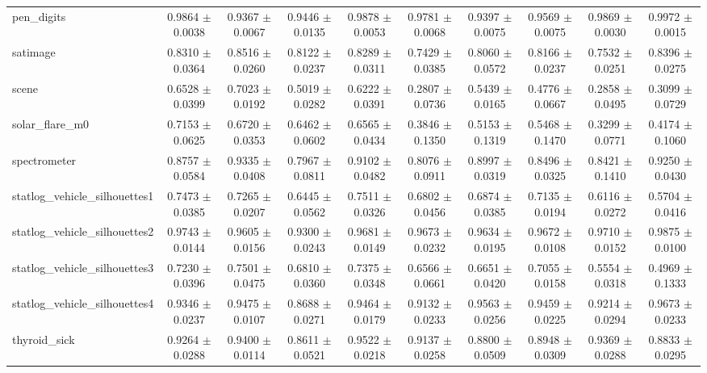 \begin{table*}[htbp]
\begin{tabular}{lccccccccc}
            pen\_digits & 0.9864 $\pm$ 0.0038 & 0.9367 $\pm$ 0.0067 & 0.9446 $\pm$ 0.0135 & 0.9878 $\pm$ 0.0053 & 0.9781 $\pm$ 0.0068 & 0.9397 $\pm$ 0.0075 & 0.9569 $\pm$ 0.0075 & 0.9869 $\pm$ 0.0030 & 0.9972 $\pm$ 0.0015 \\ 
            satimage & 0.8310 $\pm$ 0.0364 & 0.8516 $\pm$ 0.0260 & 0.8122 $\pm$ 0.0237 & 0.8289 $\pm$ 0.0311 & 0.7429 $\pm$ 0.0385 & 0.8060 $\pm$ 0.0572 & 0.8166 $\pm$ 0.0237 & 0.7532 $\pm$ 0.0251 & 0.8396 $\pm$ 0.0275 \\ 
            scene & 0.6528 $\pm$ 0.0399 & 0.7023 $\pm$ 0.0192 & 0.5019 $\pm$ 0.0282 & 0.6222 $\pm$ 0.0391 & 0.2807 $\pm$ 0.0736 & 0.5439 $\pm$ 0.0165 & 0.4776 $\pm$ 0.0667 & 0.2858 $\pm$ 0.0495 & 0.3099 $\pm$ 0.0729 \\ 
            solar\_flare\_m0 & 0.7153 $\pm$ 0.0625 & 0.6720 $\pm$ 0.0353 & 0.6462 $\pm$ 0.0602 & 0.6565 $\pm$ 0.0434 & 0.3846 $\pm$ 0.1350 & 0.5153 $\pm$ 0.1319 & 0.5468 $\pm$ 0.1470 & 0.3299 $\pm$ 0.0771 & 0.4174 $\pm$ 0.1060 \\ 
            spectrometer & 0.8757 $\pm$ 0.0584 & 0.9335 $\pm$ 0.0408 & 0.7967 $\pm$ 0.0811 & 0.9102 $\pm$ 0.0482 & 0.8076 $\pm$ 0.0911 & 0.8997 $\pm$ 0.0319 & 0.8496 $\pm$ 0.0325 & 0.8421 $\pm$ 0.1410 & 0.9250 $\pm$ 0.0430 \\ 
            statlog\_vehicle\_silhouettes1 & 0.7473 $\pm$ 0.0385 & 0.7265 $\pm$ 0.0207 & 0.6445 $\pm$ 0.0562 & 0.7511 $\pm$ 0.0326 & 0.6802 $\pm$ 0.0456 & 0.6874 $\pm$ 0.0385 & 0.7135 $\pm$ 0.0194 & 0.6116 $\pm$ 0.0272 & 0.5704 $\pm$ 0.0416 \\ 
            statlog\_vehicle\_silhouettes2 & 0.9743 $\pm$ 0.0144 & 0.9605 $\pm$ 0.0156 & 0.9300 $\pm$ 0.0243 & 0.9681 $\pm$ 0.0149 & 0.9673 $\pm$ 0.0232 & 0.9634 $\pm$ 0.0195 & 0.9672 $\pm$ 0.0108 & 0.9710 $\pm$ 0.0152 & 0.9875 $\pm$ 0.0100 \\ 
            statlog\_vehicle\_silhouettes3 & 0.7230 $\pm$ 0.0396 & 0.7501 $\pm$ 0.0475 & 0.6810 $\pm$ 0.0360 & 0.7375 $\pm$ 0.0348 & 0.6566 $\pm$ 0.0661 & 0.6651 $\pm$ 0.0420 & 0.7055 $\pm$ 0.0158 & 0.5554 $\pm$ 0.0318 & 0.4969 $\pm$ 0.1333 \\ 
            statlog\_vehicle\_silhouettes4 & 0.9346 $\pm$ 0.0237 & 0.9475 $\pm$ 0.0107 & 0.8688 $\pm$ 0.0271 & 0.9464 $\pm$ 0.0179 & 0.9132 $\pm$ 0.0233 & 0.9563 $\pm$ 0.0256 & 0.9459 $\pm$ 0.0225 & 0.9214 $\pm$ 0.0294 & 0.9673 $\pm$ 0.0233 \\ 
            thyroid\_sick & 0.9264 $\pm$ 0.0288 & 0.9400 $\pm$ 0.0114 & 0.8611 $\pm$ 0.0521 & 0.9522 $\pm$ 0.0218 & 0.9137 $\pm$ 0.0258 & 0.8800 $\pm$ 0.0509 & 0.8948 $\pm$ 0.0309 & 0.9369 $\pm$ 0.0288 & 0.8833 $\pm$ 0.0295 \\ 

\end{tabular}
\end{table*}
